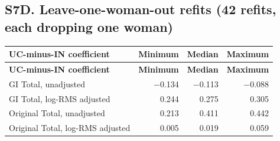 \documentclass[10pt]{article}
\begin{document}
\subsection*{S7D. Leave-one-woman-out refits (42 refits, each dropping one woman)}
\begin{longtable}{p{4.2cm}rrr}
\toprule
\textbf{UC-minus-IN coefficient} & \textbf{Minimum} & \textbf{Median} & \textbf{Maximum} \\
\midrule
\endfirsthead
\toprule
\textbf{UC-minus-IN coefficient} & \textbf{Minimum} & \textbf{Median} & \textbf{Maximum} \\
\midrule
\endhead
GI Total, unadjusted & $-$0.134 & $-$0.113 & $-$0.088 \\
GI Total, log-RMS adjusted & 0.244 & 0.275 & 0.305 \\
Original Total, unadjusted & 0.213 & 0.411 & 0.442 \\
Original Total, log-RMS adjusted & 0.005 & 0.019 & 0.059 \\
\bottomrule
\end{longtable}



\end{document}
